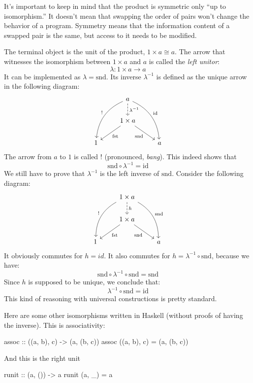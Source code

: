 \documentclass[DaoFP]{subfiles}
\begin{document}
It's important to keep in mind that the product is symmetric only ``up to isomorphism.'' It doesn't mean that swapping the order of pairs won't change the behavior of a program. Symmetry means that the information content of a swapped pair is the same, but access to it needs to be modified.

The terminal object is the unit of the product, $1 \times a \cong a$. The arrow that witnesses the isomorphism between $1 \times a$ and $a$ is called the \emph{left unitor}:
\[ \lambda \colon 1 \times a \to a \]
It can be implemented as $\lambda = \text{snd}$. Its inverse $\lambda^{-1}$ is defined as the unique arrow in the following diagram:
\[
 \begin{tikzcd}
 &a
 \arrow[d, dashed, "\lambda^{-1}"]
 \arrow[ddl, bend right, "!"']
 \arrow[ddr, bend left, "\text{id}"]
 \\
 & 1 \times a
  \arrow[dl,  "\text{fst}"]
 \arrow[dr,   "\text{snd}"']
 \\
1 && a
 \end{tikzcd}
 \]
The arrow from $a$ to $1$ is called \index{!}$!$ (pronounced, \emph{bang}). This indeed shows that 
\[\text{snd} \circ \lambda^{-1} = \text{id} \] 
We still have to prove that $\lambda^{-1}$ is the left inverse of $\text{snd}$. Consider the following diagram:
\[
 \begin{tikzcd}
 &1 \times a
 \arrow[d, dashed, "h"]
 \arrow[ddl, bend right, "!"']
 \arrow[ddr, bend left, "\text{snd}"]
 \\
 & 1 \times a
  \arrow[dl,  "\text{fst}"]
 \arrow[dr,   "\text{snd}"']
 \\
1 && a
 \end{tikzcd}
 \]
 It obviously commutes for $h = id$. It also commutes for $h = \lambda^{-1}  \circ  \text{snd}$, because we have:
 \[  \text{snd} \circ \lambda^{-1}  \circ  \text{snd} = \text{snd} \]
 Since $h$ is supposed to be unique, we conclude that:
\[ \lambda^{-1}  \circ  \text{snd} = \text{id} \]
This kind of reasoning with universal constructions is pretty standard.

Here are some other isomorphisms written in Haskell (without proofs of having the inverse). This is associativity:
\begin{haskell}
assoc :: ((a, b), c) -> (a, (b, c))
assoc ((a, b), c) = (a, (b, c))
\end{haskell}
And this is the right unit
\begin{haskell}
runit :: (a, ()) -> a
runit (a, _) = a
\end{haskell}
\end{document}
